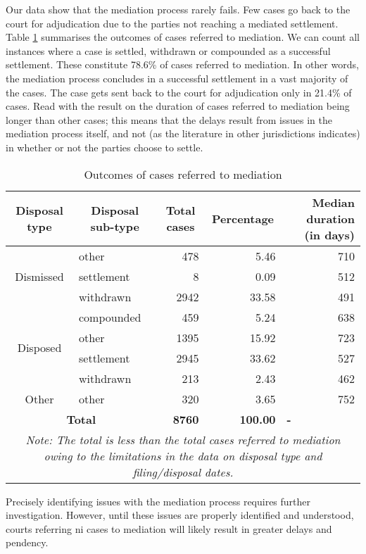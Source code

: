 Our data show that the mediation process rarely fails. Few cases go back to the court for adjudication due to the parties not reaching a mediated settlement. Table \ref{tab:mediation} summarises the outcomes of cases referred to mediation. We can count all instances where a case is settled, withdrawn or compounded as a successful settlement. These constitute 78.6\% of cases referred to mediation. In other words, the mediation process concludes in a successful settlement in a vast majority of the cases. The case gets sent back to the court for adjudication only in 21.4\% of cases. Read with the result on the duration of cases referred to mediation being longer than other cases; this means that the delays result from issues in the mediation process itself, and not (as the literature in other jurisdictions indicates) in whether or not the parties choose to settle.

{\footnotesize \begin{longtable}{@{}clrrr@{}}
\caption{Outcomes of cases referred to mediation}
\label{tab:mediation}\\
\toprule
 \textbf{Disposal type} & \multicolumn{1}{c}{\textbf{Disposal sub-type}} & \multicolumn{1}{c}{\textbf{Total cases}} & \multicolumn{1}{c}{\textbf{Percentage}} & \multicolumn{1}{p{3cm}}{\textbf{Median duration (in days)}} \\
 \midrule
\endhead
\multirow{3}{*}{Dismissed} & other & 478 & 5.46 & 710 \\
 & settlement & 8 & 0.09 & 512 \\
 & withdrawn & 2942 & 33.58 & 491 \\
 \midrule
\multirow{4}{*}{Disposed} & compounded & 459 & 5.24 & 638 \\
 & other & 1395 & 15.92 & 723 \\
 & settlement & 2945 & 33.62 & 527 \\
 & withdrawn & 213 & 2.43 & 462 \\
 \midrule
 Other & other & 320 & 3.65 & 752 \\
 \midrule
 \multicolumn{2}{c}{\textbf{Total}} & \textbf{8760} & \textbf{100.00} & \multicolumn{1}{l}{\textbf{-}} \\
 \bottomrule
 \multicolumn{5}{p{11cm}}{{\footnotesize \emph{Note: The total is less than the total cases referred to mediation owing to the limitations in the data on disposal type and filing/disposal dates.}}}
\end{longtable}}

Precisely identifying issues with the mediation process requires further investigation. However, until these issues are properly identified and understood, courts referring \gls{ni} cases to mediation will likely result in greater delays and pendency.

